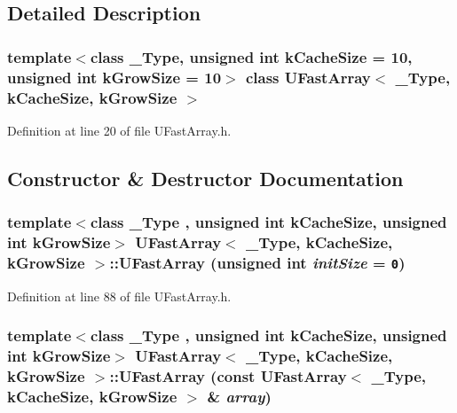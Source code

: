 \subsection{Detailed Description}
\subsubsection*{template$<$class \_\-Type, unsigned int kCacheSize = 10, unsigned int kGrowSize = 10$>$ class UFastArray$<$ \_\-Type, kCacheSize, kGrowSize $>$}



Definition at line 20 of file UFastArray.h.

\subsection{Constructor \& Destructor Documentation}
\hypertarget{class_u_fast_array_2310fb261513046671a265030604aaa1}{
\subsubsection[{UFastArray}]{\setlength{\rightskip}{0pt plus 5cm}template$<$class \_\-Type , unsigned int kCacheSize, unsigned int kGrowSize$>$ {\bf UFastArray}$<$ \_\-Type, kCacheSize, kGrowSize $>$::{\bf UFastArray} (unsigned int {\em initSize} = {\tt 0})}}
\label{class_u_fast_array_2310fb261513046671a265030604aaa1}




Definition at line 88 of file UFastArray.h.\hypertarget{class_u_fast_array_c7ef0ae1aa140c21dd0461e79bdd237d}{
\subsubsection[{UFastArray}]{\setlength{\rightskip}{0pt plus 5cm}template$<$class \_\-Type , unsigned int kCacheSize, unsigned int kGrowSize$>$ {\bf UFastArray}$<$ \_\-Type, kCacheSize, kGrowSize $>$::{\bf UFastArray} (const {\bf UFastArray}$<$ \_\-Type, kCacheSize, kGrowSize $>$ \& {\em array})}}
\label{class_u_fast_array_c7ef0ae1aa140c21dd0461e79bdd237d}




